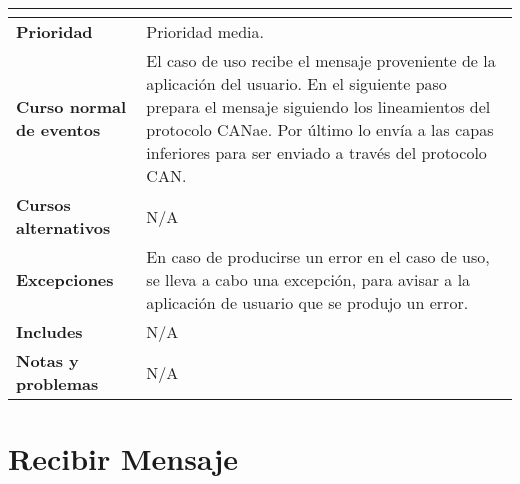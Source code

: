 \begin{longtable}{|p{5cm}|p{8cm}|}
\begin{itemize}
\end{itemize} \\ \hline
  \textbf{Prioridad} & Prioridad media. \\ \hline
  \textbf{Curso normal de eventos} & El caso de uso recibe el mensaje proveniente de la aplicación
del usuario. En el siguiente paso prepara el mensaje siguiendo
los lineamientos del protocolo CANae. Por último lo envía a las
capas inferiores para ser enviado a través del protocolo CAN. \\ \hline
\textbf{Cursos alternativos} & N/A \\ \hline
\textbf{Excepciones} & En caso de producirse un error en el caso de uso, se lleva a cabo
una excepción, para avisar a la aplicación de usuario que se
produjo un error. \\ \hline
\textbf{Includes} & N/A \\ \hline
\textbf{Notas y problemas} & N/A \\ \hline

\end{longtable}



\section{Recibir Mensaje}

